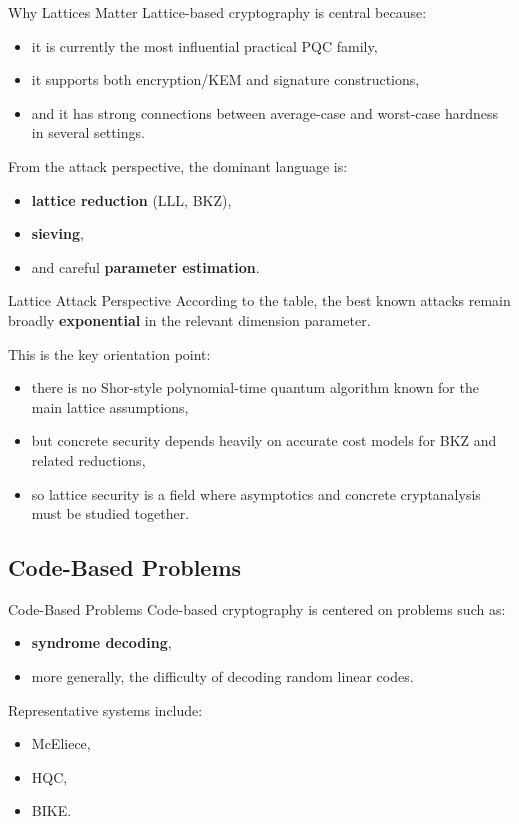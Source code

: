 \documentclass[aspectratio=169]{beamer}
\begin{document}
	\begin{frame}{Why Lattices Matter}
		Lattice-based cryptography is central because:
		\begin{itemize}
			\item it is currently the most influential practical PQC family,
			\item it supports both encryption/KEM and signature constructions,
			\item and it has strong connections between average-case and worst-case hardness in several settings.
		\end{itemize}
		
		\vspace{0.5em}
		From the attack perspective, the dominant language is:
		\begin{itemize}
			\item \textbf{lattice reduction} (LLL, BKZ),
			\item \textbf{sieving},
			\item and careful \textbf{parameter estimation}.
		\end{itemize}
	\end{frame}
	
	\begin{frame}{Lattice Attack Perspective}
		According to the table, the best known attacks remain broadly \textbf{exponential} in the relevant dimension parameter.
		
		\vspace{0.5em}
		This is the key orientation point:
		\begin{itemize}
			\item there is no Shor-style polynomial-time quantum algorithm known for the main lattice assumptions,
			\item but concrete security depends heavily on accurate cost models for BKZ and related reductions,
			\item so lattice security is a field where asymptotics and concrete cryptanalysis must be studied together.
		\end{itemize}
	\end{frame}
	
	\subsection{Code-Based Problems}
	
	\begin{frame}{Code-Based Problems}
		Code-based cryptography is centered on problems such as:
		\begin{itemize}
			\item \textbf{syndrome decoding},
			\item more generally, the difficulty of decoding random linear codes.
		\end{itemize}
		
		\vspace{0.5em}
		Representative systems include:
		\begin{itemize}
			\item McEliece,
			\item HQC,
			\item BIKE.
		\end{itemize}
	\end{frame}
	
\end{document}
